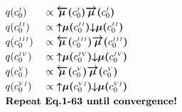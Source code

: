 \documentclass[fleqn]{article}
\begin{document}
\begin{minipage}[t]{0.5\textwidth}
\begin{alignat}{2}
         & q(c^{\scriptscriptstyle I}_0)                                       &  & \propto \bm{\overleftarrow{\mu}(}c^{\scriptscriptstyle I}_0\bm{)} \bm{\overrightarrow{\mu}(}c^{\scriptscriptstyle I}_0\bm{)}     \\
         & q(c^{\scriptscriptstyle II}_0)                                      &  & \propto \bm{{\uparrow}{\mu}(}c^{\scriptscriptstyle II}_0\bm{)} \bm{{\downarrow}{\mu}(}c^{\scriptscriptstyle II}_0\bm{)}          \\
         & q(c^{\scriptscriptstyle III}_0)                                     &  & \propto \bm{\overleftarrow{\mu}(}c^{\scriptscriptstyle III}_0\bm{)} \bm{\overrightarrow{\mu}(}c^{\scriptscriptstyle III}_0\bm{)} \\
         & q(c^{\scriptscriptstyle IV}_0)                                      &  & \propto \bm{{\uparrow}{\mu}(}c^{\scriptscriptstyle IV}_0\bm{)} \bm{{\downarrow}{\mu}(}c^{\scriptscriptstyle IV}_0\bm{)}          \\
         & q(c^{\scriptscriptstyle V}_0)                                       &  & \propto \bm{\overleftarrow{\mu}(}c^{\scriptscriptstyle V}_0\bm{)} \bm{\overrightarrow{\mu}(}c^{\scriptscriptstyle V}_0\bm{)}     \\
         & q(c^{\scriptscriptstyle VI}_0)                                      &  & \propto \bm{{\uparrow}{\mu}(}c^{\scriptscriptstyle VI}_0\bm{)} \bm{{\downarrow}{\mu}(}c^{\scriptscriptstyle VI}_0\bm{)}          \\
         & \rlap{\text{\bfseries Repeat Eq.1-63 until convergence!}} \nonumber
    \end{alignat}
\end{minipage}
\end{document}
